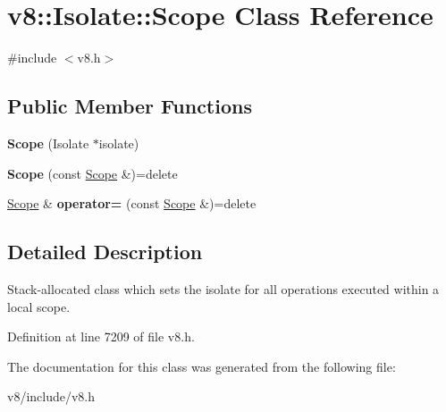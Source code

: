 \hypertarget{classv8_1_1Isolate_1_1Scope}{}\section{v8\+:\+:Isolate\+:\+:Scope Class Reference}
\label{classv8_1_1Isolate_1_1Scope}


{\ttfamily \#include $<$v8.\+h$>$}

\subsection*{Public Member Functions}
\begin{DoxyCompactItemize}
\item 
\mbox{\label{classv8_1_1Isolate_1_1Scope_a43889336478a5625e095c4444b9dd684}} 
{\bfseries Scope} (Isolate $\ast$isolate)
\item 
\mbox{\label{classv8_1_1Isolate_1_1Scope_a60cd70c0cf9bb4d65a6ff9fb4719ccde}} 
{\bfseries Scope} (const \mbox{\hyperlink{classv8_1_1Isolate_1_1Scope}{Scope}} \&)=delete
\item 
\mbox{\label{classv8_1_1Isolate_1_1Scope_ad555a0b481e05f004f48beb346025d82}} 
\mbox{\hyperlink{classv8_1_1Isolate_1_1Scope}{Scope}} \& {\bfseries operator=} (const \mbox{\hyperlink{classv8_1_1Isolate_1_1Scope}{Scope}} \&)=delete
\end{DoxyCompactItemize}


\subsection{Detailed Description}
Stack-\/allocated class which sets the isolate for all operations executed within a local scope. 

Definition at line 7209 of file v8.\+h.



The documentation for this class was generated from the following file\+:\begin{DoxyCompactItemize}
\item 
v8/include/v8.\+h\end{DoxyCompactItemize}
